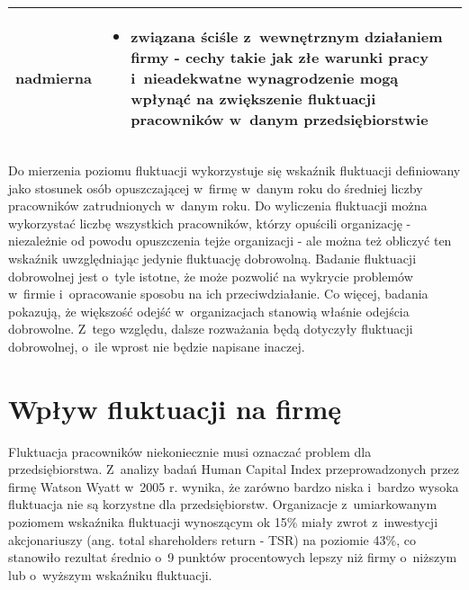 \begin{minipage}{\textwidth}
\begin{table}[H]
\begin{center}
\begin{tabular}{|P{.15\textwidth}|P{.75\textwidth}|}
                         nadmierna &
                         \begin{itemize}
                             \item związana ściśle z~wewnętrznym działaniem firmy - cechy takie jak złe warunki pracy i~nieadekwatne wynagrodzenie mogą wpłynąć na zwiększenie fluktuacji pracowników w~danym przedsiębiorstwie
                         \end{itemize}\\
                         \hline
                     \end{tabular}
                 \end{center}
                 \raggedright{}
                 \vspace{0.75cm}
             \end{table}
\end{minipage}

Do mierzenia poziomu fluktuacji wykorzystuje się wskaźnik fluktuacji definiowany jako stosunek osób opuszczającej w~firmę w~danym roku do średniej liczby pracowników zatrudnionych w~danym roku.
Do wyliczenia fluktuacji można wykorzystać liczbę wszystkich pracowników, którzy opuścili organizację - niezależnie od powodu opuszczenia tejże organizacji - ale można też obliczyć ten wskaźnik uwzględniając jedynie fluktuację dobrowolną.
Badanie fluktuacji dobrowolnej jest o~tyle istotne, że może pozwolić na wykrycie problemów w~firmie i~opracowanie sposobu na ich przeciwdziałanie.
Co więcej, badania pokazują, że większość odejść w~organizacjach stanowią właśnie odejścia dobrowolne.
Z~tego względu, dalsze rozważania będą dotyczyły fluktuacji dobrowolnej, o~ile wprost nie będzie napisane inaczej.


\section{Wpływ fluktuacji na firmę}\label{sec:wplyw-fluktuacji-na-firme}
Fluktuacja pracowników niekoniecznie musi oznaczać problem dla przedsiębiorstwa.
Z~analizy badań Human Capital Index przeprowadzonych przez firmę Watson Wyatt w~2005 r. wynika,
że zarówno bardzo niska i~bardzo wysoka fluktuacja nie są korzystne dla przedsiębiorstw.
Organizacje z~umiarkowanym poziomem wskaźnika fluktuacji wynoszącym ok 15\%
miały zwrot z~inwestycji akcjonariuszy (ang. total shareholders return - TSR) na poziomie 43\%,
co stanowiło rezultat średnio o~9 punktów procentowych lepszy niż firmy o~niższym lub o~wyższym wskaźniku fluktuacji.

